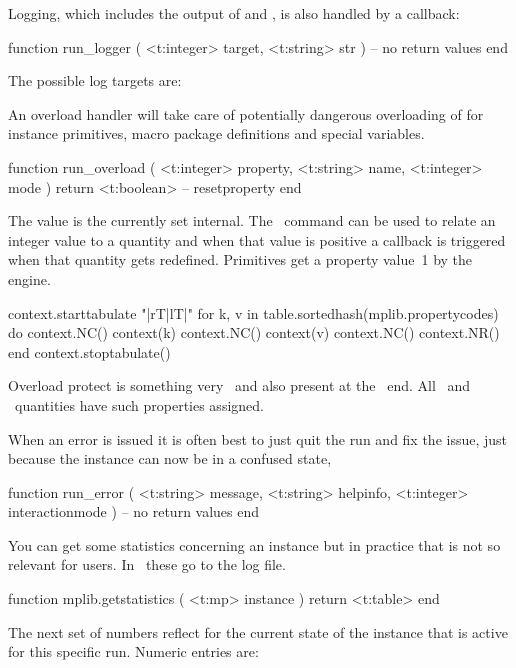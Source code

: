 Logging, which includes the output of  and , is also
handled by a callback:

\starttyping[option=LUA]
function run_logger ( <t:integer> target, <t:string> str )
    -- no return values
end
\stoptyping

The possible log targets are:


An overload handler will take care of potentially dangerous overloading of for
instance primitives, macro package definitions and special variables.

\starttyping[option=LUA]
function run_overload ( <t:integer> property, <t:string> name, <t:integer> mode )
    return <t:boolean> -- resetproperty
end
\stoptyping

The  value is the currently set 
internal. The \METAPOST\ command  can be used to
relate an integer value to a quantity and when that value is positive a callback
is triggered when that quantity gets redefined. Primitives get a property value~1
by the engine.

\startluacode
context.starttabulate { "|rT|lT|" }
for k, v in table.sortedhash(mplib.propertycodes) do
    context.NC() context(k)
    context.NC() context(v)
    context.NC() context.NR()
end
context.stoptabulate()
\stopluacode

Overload protect is something very \CONTEXT\ and also present at the \TEX\ end.
All \TEX\ and \METAPOST\ quantities have such properties assigned.

When an error is issued it is often best to just quit the run and fix the issue,
just because the instance can now be in a confused state,

\starttyping[option=LUA]
function run_error (
    <t:string>  message,
    <t:string>  helpinfo,
    <t:integer> interactionmode
)
    -- no return values
end
\stoptyping

You can get some statistics concerning an instance but in practice that is not so
relevant for users. In \CONTEXT\ these go to the log file.

\starttyping[option=LUA]
function mplib.getstatistics ( <t:mp> instance )
    return <t:table>
end
\stoptyping

The next set of numbers reflect for the current state of the 
instance that is active for this specific run. Numeric entries are:

